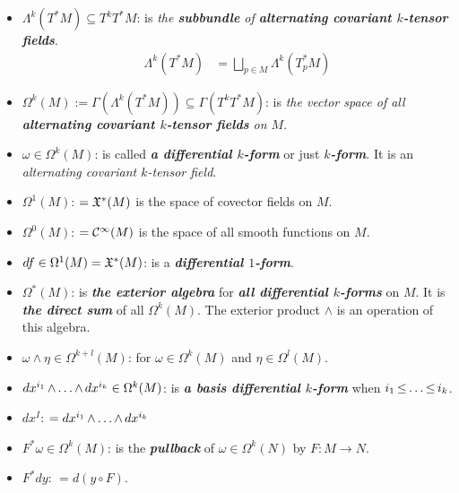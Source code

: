 \documentclass[11pt]{article}
\begin{document}
\begin{itemize}
\item $\Lambda^{k}(T^{*}M) \subseteq T^kT^{*}M$: \quad is \emph{the \textbf{subbundle} of \textbf{alternating covariant $k$-tensor fields}}.
\begin{align*}
\Lambda^{k}(T^{*}M) &= \bigsqcup_{p\in M}\Lambda^{k}(T_{p}^{*}M)
\end{align*}

\item $\Omega^k(M):= \Gamma(\Lambda^{k}(T^{*}M)) \subseteq \Gamma(T^kT^{*}M)$: \quad is \emph{the vector space of all \textbf{alternating covariant $k$-tensor fields} on $M$}.

\item $\omega \in \Omega^k(M)$: \quad is called \emph{\textbf{a differential $k$-form}} or just \emph{\textbf{$k$-form}}. It is an \emph{alternating covariant $k$-tensor field}.

\item $\Omega^1(M)$: \quad $= {\mathfrak X}^{*}(M)$ is the space of covector fields on $M$.

\item $\Omega^0(M)$: \quad $= {\mathcal C}^{\infty}(M)$ is the space of all smooth functions on $M$.

\item $df \in \Omega^1(M) = {\mathfrak X}^{*}(M)$: \quad is a \emph{\textbf{differential $1$-form}}.

\item $\Omega^{*}(M)$: \quad is \emph{\textbf{the exterior algebra}} for \emph{\textbf{all differential $k$-forms}} on $M$. It is \emph{\textbf{the direct sum}} of all $\Omega^k(M)$. The exterior product $\wedge$ is an operation of this algebra.

\item $\omega \wedge \eta \in \Omega^{k+l}(M)$: \quad for $\omega \in \Omega^k(M)$ and $\eta \in \Omega^l(M)$.

\item $dx^{i_1} \,{\wedge}\ldots{\wedge}\, dx^{i_k}  \in \Omega^k(M)$: \quad is \emph{\textbf{a basis differential $k$-form}} when $i_1 \,{\le}\ldots{\le}\, i_k$.

\item $dx^{I}$: \quad $=dx^{i_1} \,{\wedge}\ldots{\wedge}\, dx^{i_k}$

\item $F^{*}\omega \in \Omega^{k}(M)$: \quad is the \emph{\textbf{pullback}} of $\omega \in \Omega^{k}(N)$ by $F: M\rightarrow N$.

\item $F^{*}dy$: \quad $= d(y \circ F)$.


\end{itemize}
\end{document}
